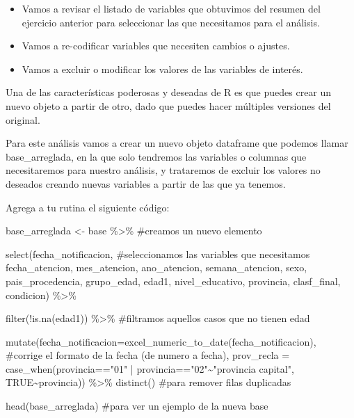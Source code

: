 \documentclass[
  letterpaper,
  DIV=11,
  numbers=noendperiod]{scrreprt}
\newenvironment{Shaded}{\begin{snugshade}}{\end{snugshade}}
\newcommand{\AttributeTok}[1]{\textcolor[rgb]{0.40,0.45,0.13}{#1}}
\newcommand{\CommentTok}[1]{\textcolor[rgb]{0.37,0.37,0.37}{#1}}
\newcommand{\ConstantTok}[1]{\textcolor[rgb]{0.56,0.35,0.01}{#1}}
\newcommand{\FunctionTok}[1]{\textcolor[rgb]{0.28,0.35,0.67}{#1}}
\newcommand{\NormalTok}[1]{\textcolor[rgb]{0.00,0.23,0.31}{#1}}
\newcommand{\OtherTok}[1]{\textcolor[rgb]{0.00,0.23,0.31}{#1}}
\newcommand{\SpecialCharTok}[1]{\textcolor[rgb]{0.37,0.37,0.37}{#1}}
\newcommand{\StringTok}[1]{\textcolor[rgb]{0.13,0.47,0.30}{#1}}
\begin{document}
\begin{itemize}
\item
  Vamos a revisar el listado de variables que obtuvimos del resumen del
  ejercicio anterior para seleccionar las que necesitamos para el
  análisis.
\item
  Vamos a re-codificar variables que necesiten cambios o ajustes.
\item
  Vamos a excluir o modificar los valores de las variables de interés.
\end{itemize}

Una de las características poderosas y deseadas de R es que puedes crear
un nuevo objeto a partir de otro, dado que puedes hacer múltiples
versiones del original.

Para este análisis vamos a crear un nuevo objeto dataframe que podemos
llamar base\_arreglada, en la que solo tendremos las variables o
columnas que necesitaremos para nuestro análisis, y trataremos de
excluir los valores no deseados creando nuevas variables a partir de las
que ya tenemos.

Agrega a tu rutina el siguiente código:

\begin{Shaded}
\begin{Highlighting}[]
\NormalTok{base\_arreglada }\OtherTok{\textless{}{-}}\NormalTok{ base }\SpecialCharTok{\%\textgreater{}\%} \CommentTok{\#creamos un nuevo elemento}

  \FunctionTok{select}\NormalTok{(fecha\_notificacion, }\CommentTok{\#seleccionamos las variables que necesitamos}
\NormalTok{         fecha\_atencion,}
\NormalTok{         mes\_atencion,}
\NormalTok{         ano\_atencion,}
\NormalTok{         semana\_atencion,}
\NormalTok{         sexo,}
\NormalTok{         pais\_procedencia,}
\NormalTok{         grupo\_edad,}
\NormalTok{         edad1,}
\NormalTok{         nivel\_educativo,}
\NormalTok{         provincia,}
\NormalTok{         clasf\_final,}
\NormalTok{         condicion) }\SpecialCharTok{\%\textgreater{}\%} 
  
  \FunctionTok{filter}\NormalTok{(}\SpecialCharTok{!}\FunctionTok{is.na}\NormalTok{(edad1)) }\SpecialCharTok{\%\textgreater{}\%}  \CommentTok{\#filtramos aquellos casos que no tienen edad}
  
  \FunctionTok{mutate}\NormalTok{(}\AttributeTok{fecha\_notificacion=}\FunctionTok{excel\_numeric\_to\_date}\NormalTok{(fecha\_notificacion), }\CommentTok{\#corrige el formato de la fecha (de numero a fecha),}
   \AttributeTok{prov\_recla =} \FunctionTok{case\_when}\NormalTok{(provincia}\SpecialCharTok{==}\StringTok{"01"} \SpecialCharTok{|}\NormalTok{ provincia}\SpecialCharTok{==}\StringTok{"02"}\SpecialCharTok{\textasciitilde{}}\StringTok{"provincia capital"}\NormalTok{,}
                          \ConstantTok{TRUE}\SpecialCharTok{\textasciitilde{}}\NormalTok{provincia)) }\SpecialCharTok{\%\textgreater{}\%} 
  \FunctionTok{distinct}\NormalTok{() }\CommentTok{\#para remover filas duplicadas}
  
  \FunctionTok{head}\NormalTok{(base\_arreglada) }\CommentTok{\#para ver un ejemplo de la nueva base}
\end{Highlighting}
\end{Shaded}
\end{document}
